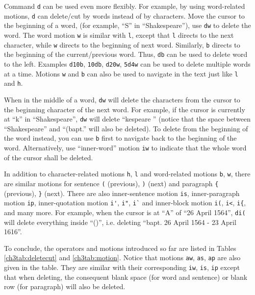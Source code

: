 Command \verb|d| can be used even more flexibly. For example, by using word-related motions, \verb|d| can delete/cut by words instead of by characters. Move the cursor to the beginning of a word, (for example, ``S'' in ``Shakespeare''), use \verb|dw| to delete the word. The word motion \verb|w| is similar with \verb|l|, except that \verb|l| directs to the next character, while \verb|w| directs to the beginning of next word. Similarly, \verb|b| directs to the beginning of the current/previous word. Thus, \verb|db| can be used to delete word to the left. Examples \verb|d10b|, \verb|10db|, \verb|d20w|, \verb|5d4w| can be used to delete multiple words at a time. Motions \verb|w| and \verb|b| can also be used to navigate in the text just like \verb|l| and \verb|h|.

When in the middle of a word, \verb|dw| will delete the characters from the cursor to the beginning character of the next word. For example, if the cursor is currently at ``k'' in ``Shakespeare'', \verb|dw| will delete ``kespeare '' (notice that the space between ``Shakespeare'' and ``(bapt.'' will also be deleted). To delete from the beginning of the word instead, you can use \verb|b| first to navigate back to the beginning of the word. Alternatively, use ``inner-word'' motion \verb|iw| to indicate that the whole word of the cursor shall be deleted.

In addition to character-related motions \verb|h|, \verb|l| and word-related motions  \verb|b|, \verb|w|, there are similar motions for sentence \verb|(| (previous), \verb|)| (next) and paragraph \verb|{| (previous), \verb|}| (next). There are also inner-sentence motion \verb|is|, inner-paragraph motion \verb|ip|, inner-quotation motion \verb|i'|, \verb|i"|, \verb|i`| and inner-block motion \verb|i(|, \verb|i<|, \verb|i{|, and many more. For example, when the cursor is at ``A'' of ``26 April 1564'', \verb|di(| will delete everything inside ``()'', i.e. deleting ``bapt. 26 April 1564 - 23 April 1616''.

To conclude, the operators and motions introduced so far are listed in Tables \ref{ch3tab:deletecut} and \ref{ch3tab:motion}. Notice that motions \verb|aw|, \verb|as|, \verb|ap| are also given in the table. They are similar with their corresponding \verb|iw|, \verb|is|, \verb|ip| except that when deleting, the consequent blank space (for word and sentence) or blank row (for paragraph) will also be deleted. 

